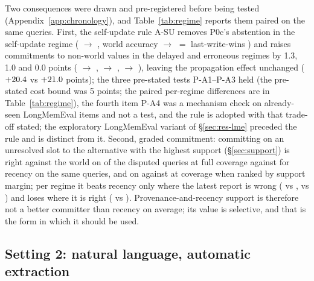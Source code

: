 Two consequences were drawn and pre-registered before being tested (Appendix~\ref{app:chronology}), and Table~\ref{tab:regime} reports them paired on the same queries. First, the self-update rule A-SU removes P0c's abstention in the self-update regime (\suFaSelfAbst{} $\to$ \suFbSelfAbst, world accuracy \suFaSelfWorld{} $\to$ \suFbSelfWorld{} $=$ last-write-wins \suFbSelfLww) and raises commitments to non-world values in the delayed and erroneous regimes by 1.3, 1.0 and 0.0 points (\suFaDelayWrong{} $\to$ \suFbDelayWrong, \suFaLowWrong{} $\to$ \suFbLowWrong, \suFaOthWrong{} $\to$ \suFbOthWrong), leaving the propagation effect unchanged ($+20.4$ vs $+21.0$ points); the three pre-stated tests P-A1--P-A3 held (the pre-stated cost bound was 5 points; the paired per-regime differences are in Table~\ref{tab:regime}), the fourth item P-A4 was a mechanism check on already-seen LongMemEval items and not a test, and the rule is adopted with that trade-off stated; the exploratory LongMemEval variant of \S\ref{sec:res-lme} preceded the rule and is distinct from it. Second, graded commitment: committing on an unresolved slot to the alternative with the highest support (\S\ref{sec:support}) is right against the world on \rgArgmaxFull{} of the \rgDisputedN{} disputed queries at full coverage against \rgLwwFull{} for recency on the same queries, and on \rgHalfArgmax{} against \rgHalfLww{} at \rgHalfCov{} coverage when ranked by support margin; per regime it beats recency only where the latest report is wrong (\rgDelayArgmax{} vs \rgDelayLww, \rgLowArgmax{} vs \rgLowLww) and loses where it is right (\rgStaleArgmax{} vs \rgStaleLww). Provenance-and-recency support is therefore not a better committer than recency on average; its value is selective, and that is the form in which it should be used.

\subsection{Setting 2: natural language, automatic extraction}\label{sec:res-s2}

